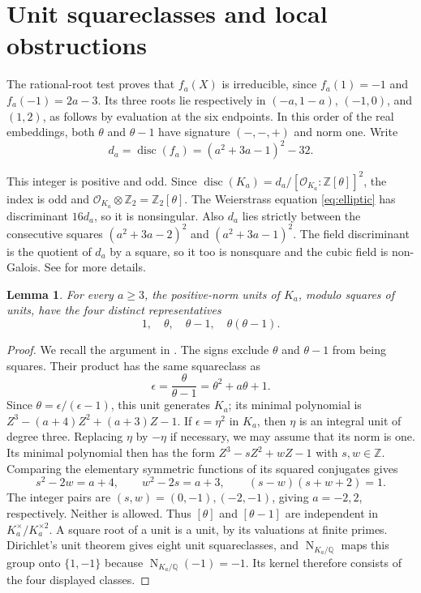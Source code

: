 \documentclass[11pt,leqno,oneside,letterpaper]{amsart}
\newtheorem{lemma}[theorem]{Lemma}
\theoremstyle{remark}
\numberwithin{equation}{section}
\newcommand{\Q}{\mathbb Q}
\newcommand{\Z}{\mathbb Z}
\DeclareMathOperator{\Nm}{N}
\begin{document}
\section{Unit squareclasses and local obstructions}

The rational-root test proves that $f_a(X)$ is irreducible, since $f_a(1)=-1$ and $f_a(-1)=2a-3$. Its three roots lie respectively in $(-a,1-a)$, $(-1,0)$, and $(1,2)$, as follows by evaluation at the six endpoints. In this order of the real embeddings, both $\theta$ and $\theta-1$ have signature $(-,-,+)$ and norm one. Write
\begin{equation}\label{eq:discriminant}
  d_a=\operatorname{disc}(f_a)=(a^2+3a-1)^2-32.
\end{equation}

This integer is positive and odd. Since $\operatorname{disc}(K_a)=d_a/[\mathcal O_{K_a}:\Z[\theta]]^2$, the index is odd and $\mathcal O_{K_a}\otimes\Z_2=\Z_2[\theta]$. The Weierstrass equation \eqref{eq:elliptic} has discriminant $16d_a$, so it is nonsingular. Also $d_a$ lies strictly between the consecutive squares $(a^2+3a-2)^2$ and $(a^2+3a-1)^2$. The field discriminant is the quotient of $d_a$ by a square, so it too is nonsquare and the cubic field is non-Galois. See \cite{Ennola1991} for more details.

\begin{lemma}\label{lem:units}
  For every $a\geq3$, the positive-norm units of $K_a$, modulo squares of units, have the four distinct representatives
  \[
    1,\quad \theta,\quad \theta-1,\quad \theta(\theta-1).
  \]
\end{lemma}

\begin{proof}
  We recall the argument in \cite[Lemma 6]{Louboutin2017}. The signs exclude $\theta$ and $\theta-1$ from being squares. Their product has the same squareclass as
  \[
    \epsilon=\frac{\theta}{\theta-1}=\theta^2+a\theta+1.
  \]
  Since $\theta=\epsilon/(\epsilon-1)$, this unit generates $K_a$; its minimal polynomial is $Z^3-(a+4)Z^2+(a+3)Z-1$. If $\epsilon=\eta^2$ in $K_a$, then $\eta$ is an integral unit of degree three. Replacing $\eta$ by $-\eta$ if necessary, we may assume that its norm is one. Its minimal polynomial then has the form $Z^3-sZ^2+wZ-1$ with $s,w\in\Z$. Comparing the elementary symmetric functions of its squared conjugates gives
  \[
    s^2-2w=a+4,\qquad w^2-2s=a+3,
    \qquad (s-w)(s+w+2)=1.
  \]
  The integer pairs are $(s,w)=(0,-1),(-2,-1)$, giving $a=-2,2$, respectively. Neither is allowed. Thus $[\theta]$ and $[\theta-1]$ are independent in $K_a^\times/K_a^{\times2}$. A square root of a unit is a unit, by its valuations at finite primes. Dirichlet's unit theorem gives eight unit squareclasses, and $\Nm_{K_a/\Q}$ maps this group onto $\{1,-1\}$ because $\Nm_{K_a/\Q}(-1)=-1$. Its kernel therefore consists of the four displayed classes.
\end{proof}
\end{document}
